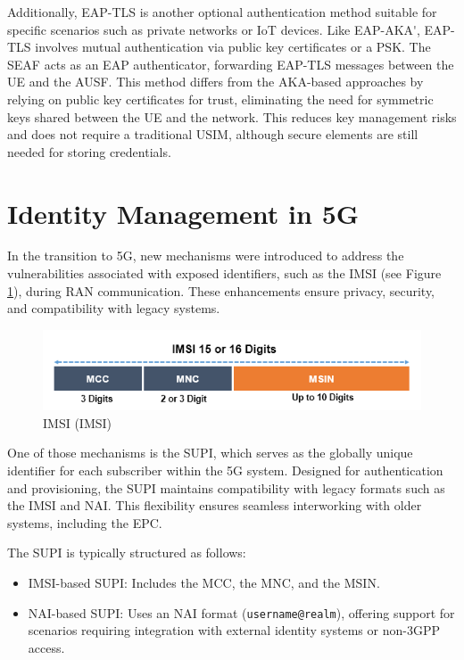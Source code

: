 Additionally, \ac{EAP-TLS} is another optional authentication method suitable for specific scenarios such as private networks or \ac{IoT} devices. Like \ac{EAP-AKA'}, \ac{EAP-TLS} involves mutual authentication via public key certificates or a \ac{PSK}. The \ac{SEAF} acts as an \ac{EAP} authenticator, forwarding \ac{EAP-TLS} messages between the \ac{UE} and the \ac{AUSF}. This method differs from the \ac{AKA}-based approaches by relying on public key certificates for trust, eliminating the need for symmetric keys shared between the \ac{UE} and the network. This reduces key management risks and does not require a traditional \ac{USIM}, although secure elements are still needed for storing credentials.

\section{Identity Management in \acs{5G}} %

In the transition to \ac{5G}, new mechanisms were introduced to address the vulnerabilities associated with exposed identifiers, such as the \ac{IMSI} (see Figure \ref{fig:International Mobile Subscriber Identity (IMSI)}), during \ac{RAN} communication. These enhancements ensure privacy, security, and compatibility with legacy systems.

\begin{figure}
    \centering
    \includegraphics[width=0.75\linewidth]{figs/International Mobile Subscriber Identity (IMSI).png}
    \caption{\acl{IMSI} (\ac{IMSI})}
    \label{fig:International Mobile Subscriber Identity (IMSI)}
\end{figure}

One of those mechanisms is the \ac{SUPI}, which serves as the globally unique identifier for each subscriber within the \ac{5G} system. Designed for authentication and provisioning, the \ac{SUPI} maintains compatibility with legacy formats such as the \ac{IMSI} and \ac{NAI}. This flexibility ensures seamless interworking with older systems, including the \ac{EPC}.

The \ac{SUPI} is typically structured as follows:
\begin{itemize}
    \item {
        \ac{IMSI}-based \ac{SUPI}: Includes the \ac{MCC}, the \ac{MNC}, and the \ac{MSIN}.
    }
    \item {
        \ac{NAI}-based \ac{SUPI}: Uses an \ac{NAI} format (\texttt{username@realm}), offering support for scenarios requiring integration with external identity systems or non-\ac{3GPP} access.
    }
\end{itemize}

